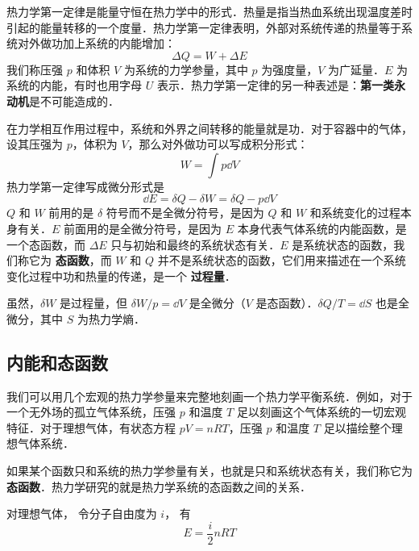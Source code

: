 
\begin{issues}
\issueDraft
\end{issues}


热力学第一定律是能量守恒在热力学中的形式．热量是指当热血系统出现温度差时引起的能量转移的一个度量．热力学第一定律表明，外部对系统传递的热量等于系统对外做功加上系统的内能增加：
\begin{equation}\label{Th1Law_eq1}
\Delta Q = W + \Delta E
\end{equation}
我们称压强 $p$ 和体积 $V$ 为系统的力学参量，其中 $p$ 为强度量，$V$ 为广延量．$E$ 为系统的内能，有时也用字母 $U$ 表示．热力学第一定律的另一种表述是：\textbf{第一类永动机}是不可能造成的．


在力学相互作用过程中，系统和外界之间转移的能量就是功．对于容器中的气体，设其压强为 $p$，体积为 $V$，那么对外做功可以写成积分形式：
\begin{equation}
W = \int p \dd{V}
\end{equation}
热力学第一定律写成微分形式是
\begin{equation}
\dd E=\delta Q-\delta W=\delta Q-p\dd V
\end{equation}
$Q$ 和 $W$ 前用的是 $\delta$ 符号而不是全微分符号，是因为 $Q$ 和 $W$ 和系统变化的过程本身有关．$E$ 前面用的是全微分符号，是因为 $E$ 本身代表气体系统的内能函数，是一个态函数，而 $\Delta E$ 只与初始和最终的系统状态有关．$E$ 是系统状态的函数，我们称它为 \textbf{态函数}，而 $W$ 和 $Q$ 并不是系统状态的函数，它们用来描述在一个系统变化过程中功和热量的传递，是一个 \textbf{过程量}．

虽然，$\delta W$ 是过程量，但 $\delta W/p=\dd V$ 是全微分（$V$ 是态函数）．$\delta Q/T=\dd S$ 也是全微分，其中 $S$ 为热力学熵．

\subsection{内能和态函数}
我们可以用几个宏观的热力学参量来完整地刻画一个热力学平衡系统．例如，对于一个无外场的孤立气体系统，压强 $p$ 和温度 $T$ 足以刻画这个气体系统的一切宏观特征．对于理想气体，有状态方程 $pV=nRT$，压强 $p$ 和温度 $T$ 足以描绘整个理想气体系统．

如果某个函数只和系统的热力学参量有关，也就是只和系统状态有关，我们称它为\textbf{态函数}．热力学研究的就是热力学系统的态函数之间的关系．

对理想气体， 令分子自由度为 $i$， 有
\begin{equation}
E = \frac{i}{2}n RT
\end{equation}


